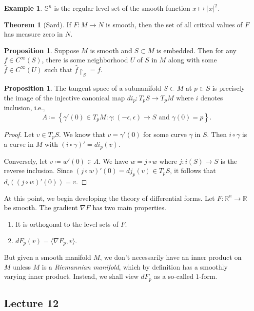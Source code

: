 \documentclass[10pt,letterpaper,cm]{nupset}
\theoremstyle{definition}
\newtheorem{exmp}[definition]{Example}
\theoremstyle{theorem}
\newtheorem{theorem}[definition]{Theorem}
\newtheorem{prop}[definition]{Proposition}
\theoremstyle{remark}
\newcommand{\R}{\mathbb R}
\renewcommand{\S}{\mathbb S}
\newcommand{\1}{\mathbf{1}}
\newcommand{\0}{\vec 0}
\begin{document}
\begin{exmp}
$\S^n$ is the regular level set of the smooth function $x\mapsto \lvert{x}\rvert^2$.
\end{exmp}

\begin{theorem}[Sard]\label{sard}
If $F: M \to N$ is smooth, then the set of all critical values of $F$ has measure zero in $N$.
\end{theorem}

\begin{prop}
Suppose $M$ is smooth and $S\subset M$ is embedded. Then for any $f \in C^{\infty}(S)$, there is some neighborhood $U$ of $S$ in $M$ along with some $\hat{f} \in C^{\infty}(U)$ such that $\hat{f}\restriction_S = f$.
\end{prop}
\begin{prop}
The tangent space of a submanifold $S \subset M$ at $p\in S$ is precisely the image of the injective canonical map $di_p : T_pS \to T_p M$ where $i$ denotes inclusion, i.e., $$A\coloneqq \left\{ \gamma ' (0) \in T_pM : \gamma : ({-\epsilon}, \epsilon) \to S \text{ and } \gamma(0) =p\right\}.$$
\end{prop}
\begin{proof}
Let $v \in T_pS$. We know that $v= \gamma'(0)$ for some curve $\gamma$ in $S$. Then $i \circ \gamma$ is a curve in $M$ with $\left(i \circ \gamma\right)'= di_p(v)$. 

Conversely, let $v\coloneqq  w'(0) \in A$. We have $w = j \circ w$ where $j: i(S) \to S$ is the reverse inclusion. Since $(j \circ w)'(0) = dj_p(v) \in T_pS$, it follows that $d_i((j \circ w)'(0)) = v$.
\end{proof}

\bigskip


At this point, we begin developing the theory of differential forms. Let $F: \R^n \to \R$ be smooth. The gradient $\nabla F$ has two main properties.
\begin{enumerate}
\item It is orthogonal to the level sets of $F$.
\item $dF_p(v) = \langle \nabla F_p, v\rangle$.
\end{enumerate}
But given a smooth manifold $M$, we don't necessarily have an inner product on $M$ unless $M$ is a \textit{Riemannian manifold}, which by definition has a smoothly varying inner product.  Instead, we shall view $dF_p$ as a so-called $1$-form.


\subsection{Lecture 12}
\end{document}
